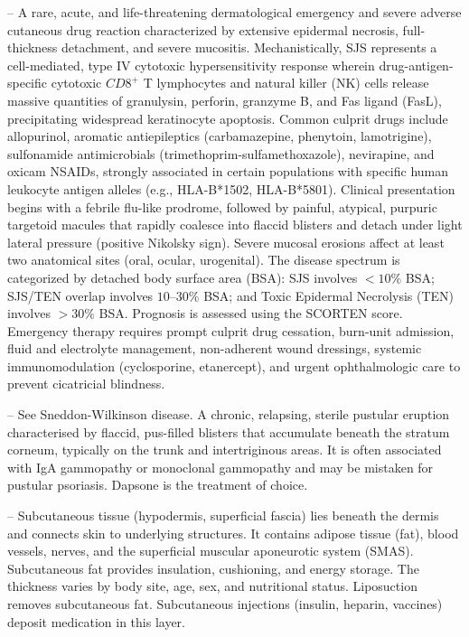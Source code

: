 -- A rare, acute, and life-threatening dermatological emergency and severe adverse cutaneous drug reaction characterized by extensive epidermal necrosis, full-thickness detachment, and severe mucositis. Mechanistically, SJS represents a cell-mediated, type IV cytotoxic hypersensitivity response wherein drug-antigen-specific cytotoxic $CD8^+$ T lymphocytes and natural killer (NK) cells release massive quantities of granulysin, perforin, granzyme B, and Fas ligand (FasL), precipitating widespread keratinocyte apoptosis. Common culprit drugs include allopurinol, aromatic antiepileptics (carbamazepine, phenytoin, lamotrigine), sulfonamide antimicrobials (trimethoprim-sulfamethoxazole), nevirapine, and oxicam NSAIDs, strongly associated in certain populations with specific human leukocyte antigen alleles (e.g., HLA-B*1502, HLA-B*5801). Clinical presentation begins with a febrile flu-like prodrome, followed by painful, atypical, purpuric targetoid macules that rapidly coalesce into flaccid blisters and detach under light lateral pressure (positive Nikolsky sign). Severe mucosal erosions affect at least two anatomical sites (oral, ocular, urogenital). The disease spectrum is categorized by detached body surface area (BSA): SJS involves $<10\%$ BSA; SJS/TEN overlap involves $10\text{--}30\%$ BSA; and Toxic Epidermal Necrolysis (TEN) involves $>30\%$ BSA. Prognosis is assessed using the SCORTEN score. Emergency therapy requires prompt culprit drug cessation, burn-unit admission, fluid and electrolyte management, non-adherent wound dressings, systemic immunomodulation (cyclosporine, etanercept), and urgent ophthalmologic care to prevent cicatricial blindness.

-- See Sneddon-Wilkinson disease. A chronic, relapsing, sterile pustular eruption characterised by flaccid, pus-filled blisters that accumulate beneath the stratum corneum, typically on the trunk and intertriginous areas. It is often associated with IgA gammopathy or monoclonal gammopathy and may be mistaken for pustular psoriasis. Dapsone is the treatment of choice.

-- Subcutaneous tissue (hypodermis, superficial fascia) lies beneath the dermis and connects skin to underlying structures. It contains adipose tissue (fat), blood vessels, nerves, and the superficial muscular aponeurotic system (SMAS). Subcutaneous fat provides insulation, cushioning, and energy storage. The thickness varies by body site, age, sex, and nutritional status. Liposuction removes subcutaneous fat. Subcutaneous injections (insulin, heparin, vaccines) deposit medication in this layer.


